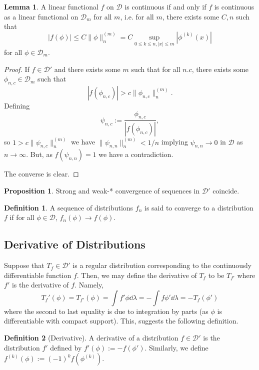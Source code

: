 \documentclass[]{article}
\theoremstyle{definition}
\theoremstyle{definition}
\newtheorem{definition}{Definition}[section]
\newtheorem{lemma}{Lemma}[section]
\newtheorem{proposition}{Proposition}[section]
\begin{document}
\begin{lemma}
  A linear functional \(f\) on \(\mathcal{D}\) is continuous if and only if \(f\) 
  is continuous as a linear functional on \(\mathcal{D}_m\) for all \(m\), i.e. 
  for all \(m\), there exists some \(C, n\) such that 
  \[|f(\phi)| \le C\|\phi\|^{(m)}_n = C\sup_{0 \le k \le n, |x| \le m}|\phi^{(k)}(x)|\]
  for all \(\phi \in \mathcal{D}_m\).
\end{lemma}
\begin{proof}
  If \(f \in \mathcal{D}'\) and there exists some \(m\) such that for all \(n. c\), 
  there exists some \(\phi_{n, c} \in \mathcal{D}_m\) such that 
  \[|f(\phi_{n, c})| > c\|\phi_{n, c}\|_n^{(m)}.\]
  Defining 
  \[\psi_{n, c} := \frac{\phi_{n, c}}{|f(\phi_{n, c})|},\]
  so \(1 > c \|\psi_{n, c}\|^{(m)}_n\) we have \(\|\psi_{n, n}\|_{n}^{(m)} < 1 / n\)
  implying \(\psi_{n, n} \to 0\) in \(\mathcal{D}\) as \(n \to \infty\). But, 
  as \(f(\psi_{n, n}) = 1\) we have a contradiction. 

  The converse is clear.
\end{proof}

\begin{proposition}
  Strong and weak-* convergence of sequences in \(\mathcal{D}'\) coincide. 
\end{proposition}

\begin{definition}
  A sequence of distributions \(f_n\) is said to converge to a distribution 
  \(f\) if for all \(\phi \in \mathcal{D}\), 
  \(f_n(\phi) \to f(\phi)\).
\end{definition}
 
\subsection{Derivative of Distributions}

Suppose that \(T_f \in \mathcal{D}'\) is a regular distribution corresponding 
to the continuously differentiable function \(f\). Then, we may define the 
derivative of \(T_f\) to be \(T_{f'}\) where \(f'\) is the derivative of \(f\).
Namely, 
\[T_f'(\phi) = T_{f'}(\phi) = \int f' \phi \dd \lambda = 
  -\int f \phi' \dd \lambda = - T_f(\phi')\]
where the second to last equality is due to integration by parts (as \(\phi\) is differentiable 
with compact support). This, suggests the following definition.

\begin{definition}[Derivative]
  A derivative of a distribution \(f \in \mathcal{D}'\) is the distribution \(f'\)
  defined by \(f'(\phi) := -f(\phi')\). Similarly, we define 
  \(f^{(k)}(\phi) := (-1)^k f(\phi^{(k)})\).
\end{definition}
\end{document}
